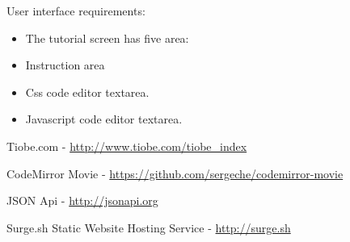 \documentclass[11pt, a4paper, twoside, openright]{report}
\begin{document}
\noindent User interface requirements:
\begin{itemize}[noitemsep]
\item The tutorial screen has five area:
\item Instruction area
\item Css code editor textarea.
\item Javascript code editor textarea.
\end{itemize}


\backmatter




\begin{thebibliography}{9}

Tiobe.com - \url{http://www.tiobe.com/tiobe_index}

CodeMirror Movie - \url{https://github.com/sergeche/codemirror-movie}

JSON Api - \url{http://jsonapi.org}

Surge.sh Static Website Hosting Service - \url{http://surge.sh}

\end{thebibliography}

\end{document}
